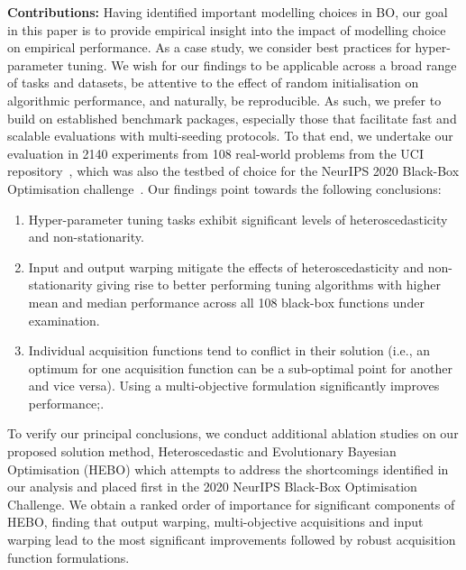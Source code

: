 \documentclass[jair,twoside,11pt,theapa]{article}
\let\cite\shortcite
\theoremstyle{definition}
\begin{document}
\noindent \textbf{Contributions:} Having identified important modelling choices in BO, our goal in this paper is to provide empirical insight into the impact of modelling choice on empirical performance. As a case study, we consider best practices for hyper-parameter tuning. We wish for our findings to be applicable across a broad range of tasks and datasets, be attentive to the effect of random initialisation on algorithmic performance, and naturally, be reproducible. As such, we prefer to build on established benchmark packages, especially those that facilitate fast and scalable evaluations with multi-seeding protocols. To that end, we undertake our evaluation in 2140 experiments from 108 real-world problems from the UCI repository~\cite{2019_Dua}, which was also the testbed of choice for the NeurIPS 2020 Black-Box Optimisation challenge~\cite{2021_Turner}. Our findings point towards the following conclusions: 
\begin{enumerate}
\item Hyper-parameter tuning tasks exhibit significant levels of heteroscedasticity and non-stationarity.
\item Input and output warping mitigate the effects of heteroscedasticity and non-stationarity giving rise to better performing tuning algorithms with higher mean and median performance across all 108 black-box functions under examination. 
\item Individual acquisition functions tend to conflict in their solution (i.e., an optimum for one acquisition function can be a sub-optimal point for another and vice versa). Using a multi-objective formulation significantly improves performance;.
\end{enumerate}


To verify our principal conclusions, we conduct additional ablation studies on our proposed solution method, Heteroscedastic and Evolutionary Bayesian Optimisation (HEBO) which attempts to address the shortcomings identified in our analysis and placed first in the 2020 NeurIPS Black-Box Optimisation Challenge. We obtain a ranked order of importance for significant components of HEBO, finding that output warping, multi-objective acquisitions and input warping lead to the most significant improvements followed by robust acquisition function formulations. 
 
\end{document}
